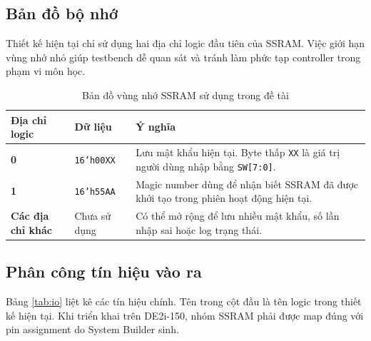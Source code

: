 \documentclass[13pt,a4paper]{article}
\begin{document}
\subsection{Bản đồ bộ nhớ}
Thiết kế hiện tại chỉ sử dụng hai địa chỉ logic đầu tiên của SSRAM. Việc giới hạn vùng nhớ nhỏ giúp testbench dễ quan sát và tránh làm phức tạp controller trong phạm vi môn học.

\begin{table}[H]
\centering
\caption{Bản đồ vùng nhớ SSRAM sử dụng trong đề tài}
\label{tab:mem_map}
\begin{tabularx}{\textwidth}{|>{\bfseries}p{3cm}|p{3.2cm}|X|}
\hline
\textbf{Địa chỉ logic} & \textbf{Dữ liệu} & \textbf{Ý nghĩa}\\
\hline
0 & \texttt{16'h00XX} & Lưu mật khẩu hiện tại. Byte thấp \texttt{XX} là giá trị người dùng nhập bằng \texttt{SW[7:0]}.\\
\hline
1 & \texttt{16'h55AA} & Magic number dùng để nhận biết SSRAM đã được khởi tạo trong phiên hoạt động hiện tại.\\
\hline
Các địa chỉ khác & Chưa sử dụng & Có thể mở rộng để lưu nhiều mật khẩu, số lần nhập sai hoặc log trạng thái.\\
\hline
\end{tabularx}
\end{table}

\subsection{Phân công tín hiệu vào ra}
Bảng \ref{tab:io} liệt kê các tín hiệu chính. Tên trong cột đầu là tên logic trong thiết kế hiện tại. Khi triển khai trên DE2i-150, nhóm SSRAM phải được map đúng với pin assignment do System Builder sinh.
\end{document}
